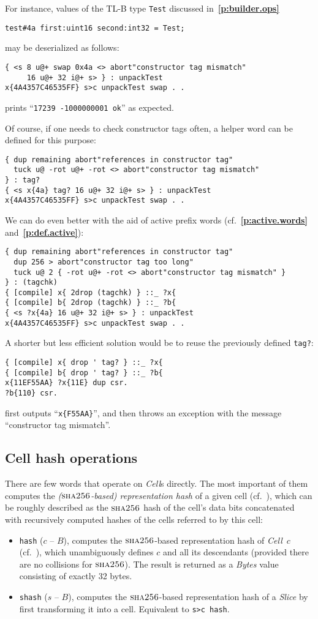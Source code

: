 \documentclass[12pt,oneside]{article}
\def\refpoint#1{{\rm\textbf{\ref{#1}}}}
\let\ptref=\refpoint
\def\mysubsection#1{\subsection{#1}\fancyhead[C]{\small{\textsc{\textrm{\thesubsection.} #1}}}}
\def\opsc#1{\operatorname{\textsc{#1}}}
\def\Sha{\opsc{sha256}}
\begin{document}
For instance, values of the TL-B type {\tt Test} discussed in~\ptref{p:builder.ops}
\begin{verbatim}
test#4a first:uint16 second:int32 = Test;
\end{verbatim}
may be deserialized as follows:
\begin{verbatim}
{ <s 8 u@+ swap 0x4a <> abort"constructor tag mismatch"
     16 u@+ 32 i@+ s> } : unpackTest
x{4A4357C46535FF} s>c unpackTest swap . .
\end{verbatim}
prints ``{\tt 17239 -1000000001 ok}'' as expected.

Of course, if one needs to check constructor tags often, a helper word can be defined for this purpose:
\begin{verbatim}
{ dup remaining abort"references in constructor tag"
  tuck u@ -rot u@+ -rot <> abort"constructor tag mismatch"
} : tag?
{ <s x{4a} tag? 16 u@+ 32 i@+ s> } : unpackTest
x{4A4357C46535FF} s>c unpackTest swap . .
\end{verbatim}
We can do even better with the aid of active prefix words (cf.~\ptref{p:active.words} and~\ptref{p:def.active}):
\begin{verbatim}
{ dup remaining abort"references in constructor tag"
  dup 256 > abort"constructor tag too long"
  tuck u@ 2 { -rot u@+ -rot <> abort"constructor tag mismatch" }
} : (tagchk)
{ [compile] x{ 2drop (tagchk) } ::_ ?x{
{ [compile] b{ 2drop (tagchk) } ::_ ?b{
{ <s ?x{4a} 16 u@+ 32 i@+ s> } : unpackTest
x{4A4357C46535FF} s>c unpackTest swap . .
\end{verbatim}
A shorter but less efficient solution would be to reuse the previously defined {\tt tag?}:
\begin{verbatim}
{ [compile] x{ drop ' tag? } ::_ ?x{
{ [compile] b{ drop ' tag? } ::_ ?b{
x{11EF55AA} ?x{11E} dup csr.
?b{110} csr.
\end{verbatim}
first outputs ``{\tt x\{F55AA\}}'', and then throws an exception with the message ``constructor tag mismatch''.

\mysubsection{Cell hash operations}\label{p:hash.ops}
There are few words that operate on {\em Cell\/}s directly. The most important of them computes the {\em ($\Sha$-based) representation hash\/} of a given cell (cf.~\cite[3.1]{TVM}), which can be roughly described as the $\Sha$ hash of the cell's data bits concatenated with recursively computed hashes of the cells referred to by this cell:
\begin{itemize}
\item {\tt hash} ($c$ -- $B$), computes the $\Sha$-based representation hash of {\em Cell\/}~$c$ (cf.~\cite[3.1]{TVM}), which unambiguously defines $c$ and all its descendants (provided there are no collisions for $\Sha$). The result is returned as a {\em Bytes\/} value consisting of exactly 32 bytes.
\item {\tt shash} ($s$ -- $B$), computes the $\Sha$-based representation hash of a {\em Slice\/} by first transforming it into a cell. Equivalent to {\tt s>c hash}.
\end{itemize}
\end{document}

